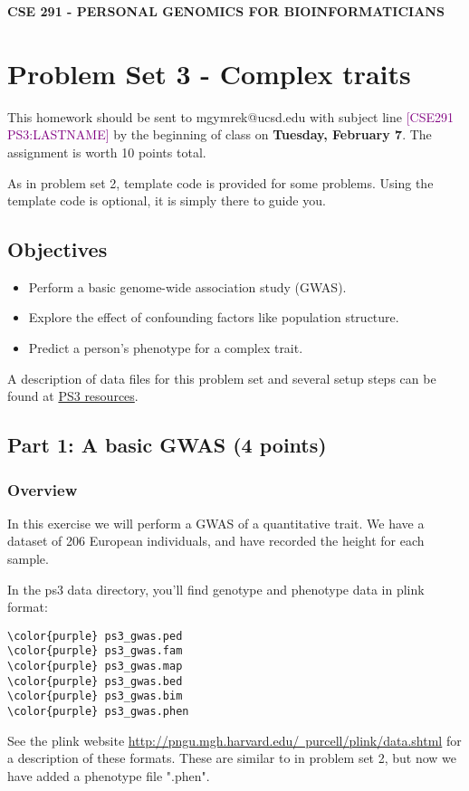 \documentclass[12pt]{article}
\begin{document}
\textbf{CSE 291 - PERSONAL GENOMICS FOR BIOINFORMATICIANS}

\section*{Problem Set 3 - Complex traits}

This homework should be sent to mgymrek@ucsd.edu with subject line \textcolor{purple}{[CSE291 PS3:LASTNAME]} by the beginning of class on \textbf{Tuesday, February 7}. The assignment is worth 10 points total.

As in problem set 2, template code is provided for some problems. Using the template code is optional, it is simply there to guide you.

\subsection*{Objectives}
\begin{itemize}
\item Perform a basic genome-wide association study (GWAS).
\item Explore the effect of confounding factors like population structure.
\item Predict a person's phenotype for a complex trait.
\end{itemize}

A description of data files for this problem set and several setup steps can be found at \href{https://gymreklab.github.io/teaching/personal\_genomics/ps3\_resources.html}{PS3 resources}. 

\subsection*{Part 1: A basic GWAS (4 points)}

\subsubsection*{Overview}

In this exercise we will perform a GWAS of a quantitative trait. We have a dataset of 206 European individuals, and have recorded the height for each sample.

In the ps3 data directory, you'll find genotype and phenotype data in plink format:  
\begin{Verbatim}[commandchars=\\\{\}]
\color{purple} ps3_gwas.ped
\color{purple} ps3_gwas.fam
\color{purple} ps3_gwas.map
\color{purple} ps3_gwas.bed
\color{purple} ps3_gwas.bim
\color{purple} ps3_gwas.phen
\end{Verbatim}
See the plink website \href{http://pngu.mgh.harvard.edu/~purcell/plink/data.shtml}{http://pngu.mgh.harvard.edu/~purcell/plink/data.shtml} for a description of these formats. These are similar to in problem set 2, but now we have added a phenotype file ".phen".
\end{document}
